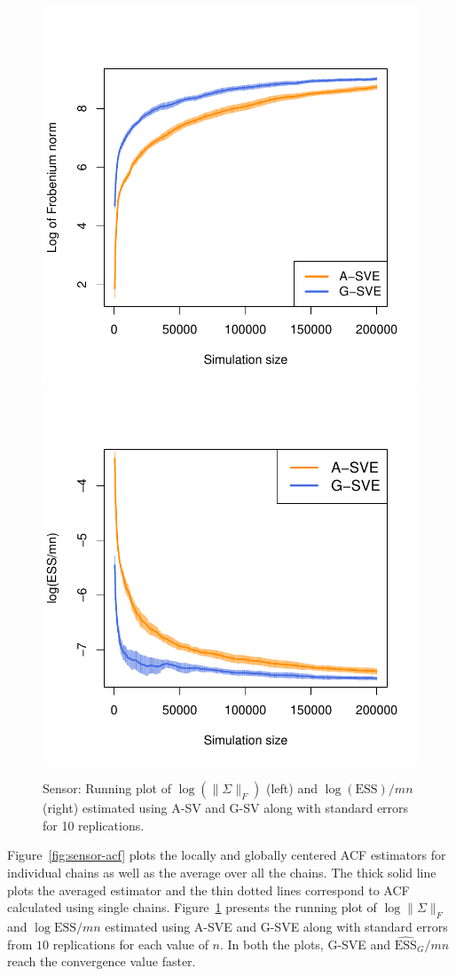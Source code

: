 \documentclass[11pt]{article}
\theoremstyle{remark}
\begin{document}


\begin{figure}
    \centering
      \includegraphics[width = .30\textwidth]{plots/sensor-frob.pdf} 
      \includegraphics[width = .30\textwidth]{plots/sensor-ess.pdf}

    \caption{Sensor: Running plot of $\log (\|{\Sigma}\|_F)$ (left) and $\log ({\textrm{ESS}})/mn$ (right) estimated using A-SV and G-SV along with standard errors for 10 replications.}
    \label{fig:sensor-frob_n_ess}
\end{figure}

Figure~\ref{fig:sensor-acf} plots the locally and globally centered ACF estimators for individual chains  as well as the average over all the chains. The thick solid line plots the averaged estimator and the thin dotted lines correspond to ACF calculated using single chains. Figure~\ref{fig:sensor-frob_n_ess} presents the running plot of $\log \|{\Sigma}\|_F$ and $\log \textrm{ESS}/mn$ estimated using A-SVE and G-SVE along with standard errors from $10$ replications for each value of $n$. In both the plots, G-SVE and $\widehat{\textrm{ESS}}_G/mn$ reach the convergence value faster.
\end{document}
